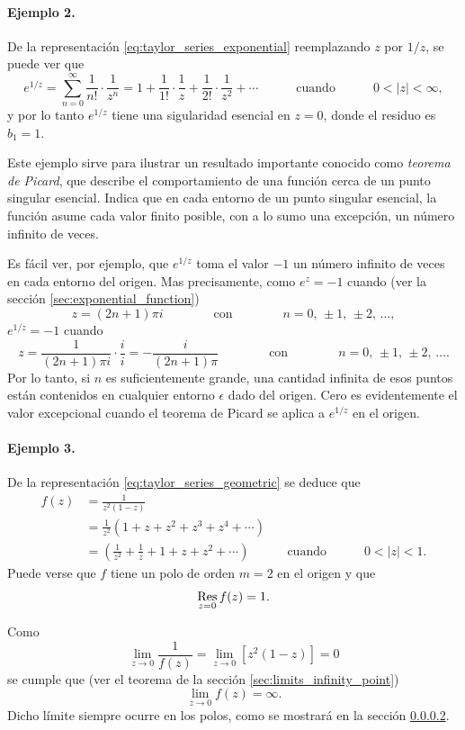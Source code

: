 \documentclass[a4paper]{report}
\def\Res{\qopname\relax m{Res}}
\begin{document}
\paragraph{Ejemplo 2.} De la representación \ref{eq:taylor_series_exponential} reemplazando \(z\) por \(1/z\), se puede ver que 
\[
 e^{1/z}=\sum_{n=0}^\infty\frac{1}{n!}\cdot\frac{1}{z^n}=1+\frac{1}{1!}\cdot\frac{1}{z}+\frac{1}{2!}\cdot\frac{1}{z^2}+\cdots 
 \qquad\quad\textrm{cuando}\quad\qquad
  0<|z|<\infty,
\]
y por lo tanto \(e^{1/z}\) tiene una sigularidad esencial en \(z=0\), donde el residuo es \(b_1=1\).

Este ejemplo sirve para ilustrar un resultado importante conocido como \emph{teorema de Picard}, que describe el comportamiento de una función cerca de un punto singular esencial. Indica que en cada entorno de un punto singular esencial, la función asume cada valor finito posible, con a lo sumo una excepción, un número infinito de veces. 

Es fácil ver, por ejemplo, que \(e^{1/z}\) toma el valor \(-1\) un número infinito de veces en cada entorno del origen. Mas precisamente, como \(e^z=-1\) cuando (ver la sección \ref{sec:exponential_function})
\[
 z=(2n+1)\pi i
 \qquad\qquad\textrm{con}\qquad\qquad
 n=0,\,\pm1,\,\pm2,\,\dots,
\]
\(e^{1/z}=-1\) cuando
\[
 z=\frac{1}{(2n+1)\pi i}\cdot\frac{i}{i}=-\frac{i}{(2n+1)\pi}
 \qquad\qquad\textrm{con}\qquad\qquad
 n=0,\,\pm1,\,\pm2,\,\dots.
\]
Por lo tanto, si \(n\) es suficientemente grande, una cantidad infinita de esos puntos están contenidos en cualquier entorno \(\epsilon\) dado del origen. Cero es evidentemente el valor excepcional cuando el teorema de Picard se aplica a \(e^{1/z}\) en el origen.

\paragraph{Ejemplo 3.} De la representación \ref{eq:taylor_series_geometric} se deduce que 
\begin{align*}
 f(z)&=\frac{1}{z^2(1-z)}\\
   &=\frac{1}{z^2}\left(1+z+z^2+z^3+z^4+\cdots\right)\\
   &=\left(\frac{1}{z^2}+\frac{1}{z}+1+z+z^2+\cdots\right)
   \qquad\quad\textrm{cuando}\quad\qquad
   0<|z|<1.
\end{align*}
Puede verse que \(f\) tiene un polo de orden \(m=2\) en el origen y que 
\[
 \Res_{z=0}f(z)=1.
\]

Como
\[
 \lim_{z\to0}\frac{1}{f(z)}=\lim_{z\to0}[z^2(1-z)]=0
\]
se cumple que (ver el teorema de la sección \ref{sec:limits_infinity_point})
\[
 \lim_{z\to0}f(z)=\infty.
\]
Dicho límite siempre ocurre en los polos, como se mostrará en la sección \ref{}.
\end{document}
